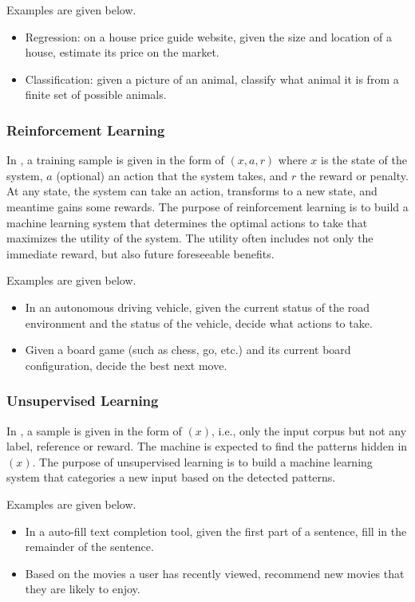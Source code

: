 Examples are given below.
\begin{itemize}
\item Regression: on a house price guide website, given the size and location of a house, estimate its price on the market.
\item Classification: given a picture of an animal, classify what animal it is from a finite set of possible animals.
\end{itemize}

\subsubsection*{Reinforcement Learning}

In , a training sample is given in the form of $(x, a, r)$ where $x$ is the state of the system, $a$ (optional) an action that the system takes, and $r$ the reward or penalty. At any state, the system can take an action, transforms to a new state, and meantime gains some rewards. The purpose of reinforcement learning is to build a machine learning system that determines the optimal actions to take that maximizes the utility of the system. The utility often includes not only the immediate reward, but also future foreseeable benefits. 

Examples are given below. 
\begin{itemize}
\item In an autonomous driving vehicle, given the current status of the road environment and the status of the vehicle, decide what actions to take.
\item Given a board game (such as chess, go, etc.) and its current board configuration, decide the best next move.
\end{itemize}

\subsubsection*{Unsupervised Learning}

In , a sample is given in the form of $(x)$, i.e., only the input corpus but not any label, reference or reward. The machine is expected to find the patterns hidden in $(x)$. The purpose of unsupervised learning is to build a machine learning system that categories a new input based on the detected patterns. 

Examples are given below.
\begin{itemize}
\item In a auto-fill text completion tool, given the first part of a sentence, fill in the remainder of the sentence.
\item Based on the movies a user has recently viewed, recommend new movies that they are likely to enjoy.
\end{itemize}

